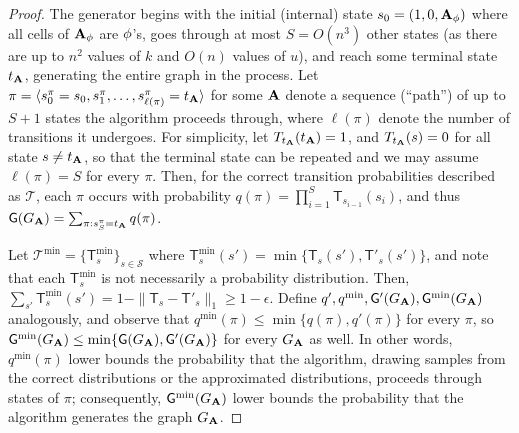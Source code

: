\begin{proof}
The generator begins with the initial (internal) state $s_0 = (1, 0, \mathbf{A}_\phi)$ where all cells of $\mathbf{A}_\phi$ are $\phi$'s, goes through at most $S=O(n^3)$ other states (as there are up to $n^2$ values of $k$ and $O(n)$ values of $u$), and reach some terminal state $t_{\mathbf{A}}$, generating the entire graph in the process. Let $\pi = \langle s^\pi_0 = s_0, s^\pi_1, \ldots, s^\pi_{\ell(\pi)} = t_{\mathbf{A}} \rangle$ for some $\mathbf{A}$ denote a sequence (``path'') of up to $S+1$ states the algorithm proceeds through, where $\ell(\pi)$ denote the number of transitions it undergoes. For simplicity, let $T_{t_{\mathbf{A}}}(t_{\mathbf{A}})=1$, and $T_{t_{\mathbf{A}}}(s)=0$ for all state $s \neq t_{\mathbf{A}}$, so that the terminal state can be repeated and we may assume $\ell(\pi) = S$ for every $\pi$. Then, for the correct transition probabilities described as $\mathcal{T}$, each $\pi$ occurs with probability $q(\pi) = \prod_{i=1}^{S} \mathsf{T}_{s_{i-1}}(s_i)$, and thus $\mathsf{G}(G_{\mathbf{A}}) = \sum_{\pi:s^\pi_{S} = t_{\mathbf{A}}} q(\pi)$.

Let $\mathcal{T}^{\min}=\{\mathsf{T}^{\min}_s\}_{s\in\mathcal{S}}$ where $\mathsf{T}^{\min}_s(s') = \min\{\mathsf{T}_s(s'),\mathsf{T}'_s(s')\}$, and note that each $\mathsf{T}^{\min}_s$ is not necessarily a probability distribution. Then, $\sum_{s'} \mathsf{T}^{\min}_s(s') = 1 - \|\mathsf{T}_s-\mathsf{T}'_s\|_1 \geq 1-\epsilon$. Define $q', q^{\min}, \mathsf{G}'(G_{\mathbf{A}}),\mathsf{G}^{\min}(G_{\mathbf{A}})$ analogously, and observe that $q^{\min}(\pi) \leq \min\{q(\pi), q'(\pi)\}$ for every $\pi$, so $\mathsf{G}^{\min}(G_{\mathbf{A}}) \leq \min\{\mathsf{G}(G_{\mathbf{A}}),\mathsf{G}'(G_{\mathbf{A}})\}$ for every $G_{\mathbf{A}}$ as well. In other words, $q^{\min}(\pi)$ lower bounds the probability that the algorithm, drawing samples from the correct distributions or the approximated distributions, proceeds through states of $\pi$; consequently, $\mathsf{G}^{\min}(G_{\mathbf{A}})$ lower bounds the probability that the algorithm generates the graph $G_{\mathbf{A}}$.


\end{proof}
